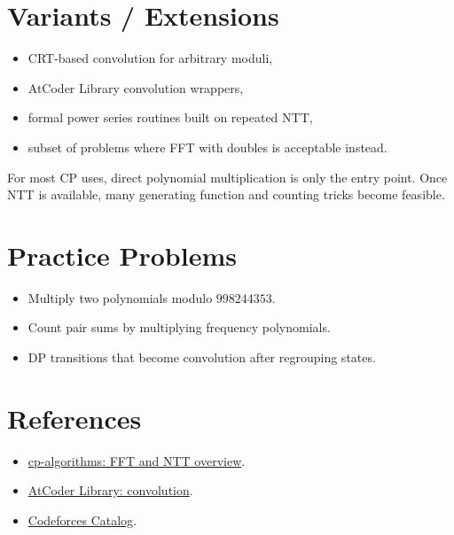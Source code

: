 \section*{Variants / Extensions}

\begin{itemize}
  \item CRT-based convolution for arbitrary moduli,
  \item AtCoder Library convolution wrappers,
  \item formal power series routines built on repeated NTT,
  \item subset of problems where FFT with doubles is acceptable instead.
\end{itemize}

For most CP uses, direct polynomial multiplication is only the entry point. Once NTT is available, many generating
function and counting tricks become feasible.

\section*{Practice Problems}

\begin{itemize}
  \item Multiply two polynomials modulo \(998244353\).
  \item Count pair sums by multiplying frequency polynomials.
  \item DP transitions that become convolution after regrouping states.
\end{itemize}

\section*{References}

\begin{itemize}
  \item \href{https://cp-algorithms.com/algebra/fft.html}{cp-algorithms: FFT and NTT overview}.
  \item \href{https://atcoder.github.io/ac-library/production/document_en/convolution.html}{AtCoder Library: convolution}.
  \item \href{https://codeforces.com/catalog}{Codeforces Catalog}.
\end{itemize}
